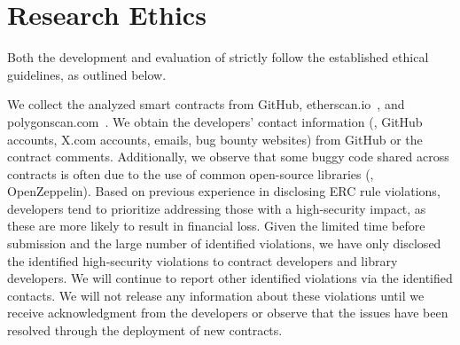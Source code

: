 \newpage

\section*{Research Ethics}
Both the development and evaluation of \Tool{} strictly follow the established ethical guidelines, as outlined below.

We collect the analyzed smart contracts from GitHub, etherscan.io~\cite{etherscan}, 
and polygonscan.com~\cite{polygonscan}. 
We obtain the developers' contact information (\eg, GitHub accounts, X.com accounts, emails, bug bounty websites) from GitHub or the contract comments. 
Additionally, we observe that some buggy code shared across contracts is often due to the use of common open-source libraries (\eg, OpenZeppelin).
Based on previous experience in disclosing ERC rule violations, 
developers tend to prioritize addressing those with a high-security impact, 
as these are more likely to result in financial loss. 
Given the limited time before submission and the large number of identified violations, 
we have only disclosed the identified high-security violations to contract developers and library developers. 
We will continue to report other identified violations via the identified contacts. 
We will not release any information about these violations 
until we receive acknowledgment from the developers or 
observe that the issues have been resolved through the deployment of new contracts.


\fi


